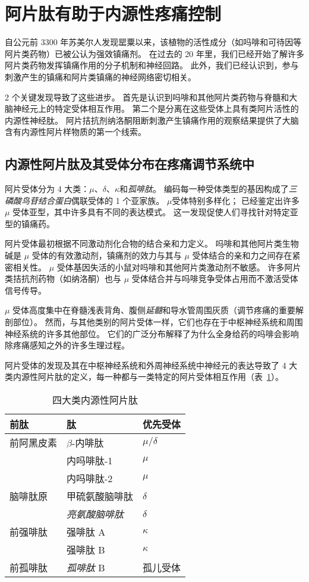 \section{阿片肽有助于内源性疼痛控制}

自公元前 3300 年苏美尔人发现罂粟以来，该植物的活性成分（如吗啡和可待因等阿片类药物）已被公认为强效镇痛剂。
在过去的 20 年里，我们已经开始了解许多阿片类药物发挥镇痛作用的分子机制和神经回路。
此外，我们已经认识到，参与刺激产生的镇痛和阿片类镇痛的神经网络密切相关。


2 个关键发现导致了这些进步。
首先是认识到吗啡和其他阿片类药物与脊髓和大脑神经元上的特定受体相互作用。
第二个是分离在这些受体上具有类阿片活性的内源性神经肽。
阿片拮抗剂纳洛酮阻断刺激产生镇痛作用的观察结果提供了大脑含有内源性阿片样物质的第一个线索。



\subsection{内源性阿片肽及其受体分布在疼痛调节系统中}

阿片受体分为 4 大类：$\mu$、$ \delta $、$ \kappa $和\textit{孤啡肽}。
编码每一种受体类型的基因构成了\textit{三磷酸鸟苷结合蛋白}偶联受体的 1 个亚家族。
$\mu$受体特别多样化；
已经鉴定出许多 $\mu$ 受体亚型，其中许多具有不同的表达模式。
这一发现促使人们寻找针对特定亚型的镇痛药。


阿片受体最初根据不同激动剂化合物的结合亲和力定义。
吗啡和其他阿片类生物碱是 $\mu$ 受体的有效激动剂，镇痛剂的效力与其与 $\mu$ 受体结合的亲和力之间存在紧密相关性。
$\mu$ 受体基因失活的小鼠对吗啡和其他阿片类激动剂不敏感。
许多阿片类拮抗剂药物（如纳洛酮）也与 $\mu$ 受体结合并与吗啡竞争受体占用而不激活受体信号传导。


$\mu$ 受体高度集中在脊髓浅表背角、腹侧\textit{延髓}和导水管周围灰质（调节疼痛的重要解剖部位）。
然而，与其他类别的阿片受体一样，它们也存在于中枢神经系统和周围神经系统的许多其他部位。
它们的广泛分布解释了为什么全身给药的吗啡会影响除疼痛感知之外的许多生理过程。


阿片受体的发现及其在中枢神经系统和外周神经系统中神经元的表达导致了 4 大类内源性阿片肽的定义，每一种都与一类特定的阿片受体相互作用（表~\ref{tab:20_1}）。


\begin{table}[htbp]
	\caption{四大类内源性阿片肽} \label{tab:20_1} \centering
	\begin{tabular}{lll}
		\toprule
		前肽 & 肽 & 优先受体 \\
		\midrule
		前阿黑皮素 & $\beta$-内啡肽 & $\mu / \delta$  \\
		 & 内吗啡肽-1 & $\mu$  \\
		 & 内吗啡肽-2 & $\mu$  \\
		脑啡肽原 & 甲硫氨酸脑啡肽 & $\delta$  \\
		 & \textit{亮氨酸脑啡肽} & $\delta$  \\
		前强啡肽 & 强啡肽 A & $\kappa$  \\
		 & 强啡肽 B & $\kappa$  \\
		前孤啡肽 & \textit{孤啡肽} B & 孤儿受体  \\
		\bottomrule
	\end{tabular}
\end{table}


